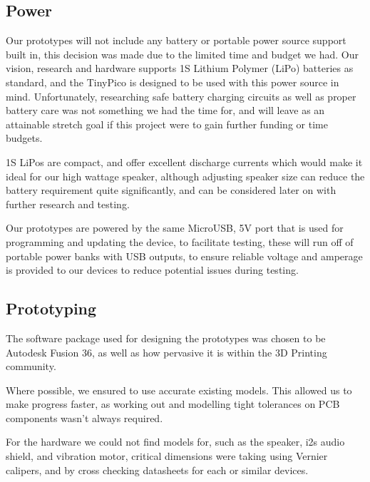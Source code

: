         \subsection{Power}
        \label{subsec: Power}
            Our prototypes will not include any battery or portable power source support built in, this decision was made due to the limited time and budget we had. Our vision, research and hardware supports 1S Lithium Polymer (LiPo) batteries as standard, and the TinyPico is designed to be used with this power source in mind. Unfortunately, researching safe battery charging circuits as well as proper battery care was not something we had the time for, and will leave as an attainable stretch goal if this project were to gain further funding or time budgets.


            1S LiPos are compact, and offer excellent discharge currents which would make it ideal for our high wattage speaker, although adjusting speaker size can reduce the battery requirement quite significantly, and can be considered later on with further research and testing.

            Our prototypes are powered by the same MicroUSB, 5V port that is used for programming and updating the device, to facilitate testing, these will run off of portable power banks with USB outputs, to ensure reliable voltage and amperage is provided to our devices to reduce potential issues during testing.

        \subsection{Prototyping}
        \label{subsec: Prototyping}
        
            The software package used for designing the prototypes was chosen to be Autodesk Fusion 36, as well as how pervasive it is within the 3D Printing community.

            Where possible, we ensured to use accurate existing models. This allowed us to make progress faster, as working out and modelling tight tolerances on PCB components wasn't always required. 

            For the hardware we could not find models for, such as the speaker, i2s audio shield, and vibration motor, critical dimensions were taking using Vernier calipers, and by cross checking datasheets for each or similar devices.

